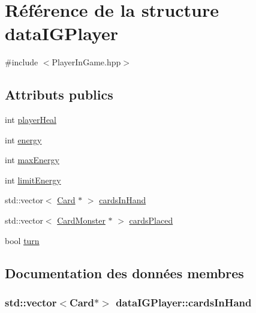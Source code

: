 \hypertarget{structdataIGPlayer}{}\section{Référence de la structure data\+I\+G\+Player}
\label{structdataIGPlayer}


{\ttfamily \#include $<$Player\+In\+Game.\+hpp$>$}

\subsection*{Attributs publics}
\begin{DoxyCompactItemize}
\item 
int \hyperlink{structdataIGPlayer_addf0349de6577e21e1697b0853f37afb}{player\+Heal}
\item 
int \hyperlink{structdataIGPlayer_a62d62c03941a981f96ae02098ae8d2e2}{energy}
\item 
int \hyperlink{structdataIGPlayer_a27dcb13892444b5fcfebe7d01d05141a}{max\+Energy}
\item 
int \hyperlink{structdataIGPlayer_ae0958559747cb2ebad4e6c7ba6095c3f}{limit\+Energy}
\item 
std\+::vector$<$ \hyperlink{classCard}{Card} $\ast$ $>$ \hyperlink{structdataIGPlayer_a7b7ae3550424bffaff4cba98fdd2e39b}{cards\+In\+Hand}
\item 
std\+::vector$<$ \hyperlink{classCardMonster}{Card\+Monster} $\ast$ $>$ \hyperlink{structdataIGPlayer_a32709b71453d54100f95fae5535c0cb5}{cards\+Placed}
\item 
bool \hyperlink{structdataIGPlayer_a42cbe10f46e1e6bbd514e624cf6e1526}{turn}
\end{DoxyCompactItemize}


\subsection{Documentation des données membres}
\hypertarget{structdataIGPlayer_a7b7ae3550424bffaff4cba98fdd2e39b}{}
\subsubsection[{cards\+In\+Hand}]{\setlength{\rightskip}{0pt plus 5cm}std\+::vector$<${\bf Card}$\ast$$>$ data\+I\+G\+Player\+::cards\+In\+Hand}\label{structdataIGPlayer_a7b7ae3550424bffaff4cba98fdd2e39b}
\hypertarget{structdataIGPlayer_a32709b71453d54100f95fae5535c0cb5}{}
